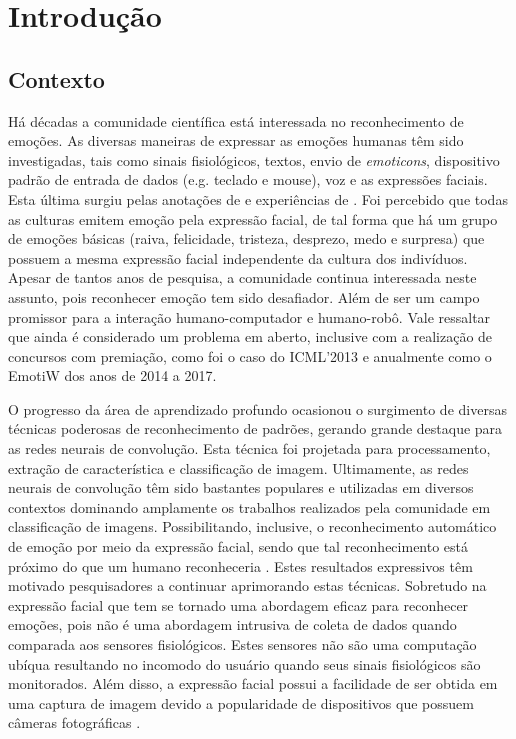 \chapter{Introdução}\label{sec:introducao}

\section{Contexto}
Há décadas a comunidade científica está interessada no reconhecimento de emoções. As diversas maneiras de expressar as emoções humanas têm sido investigadas, tais como sinais fisiológicos, textos, envio de \textit{emoticons}, dispositivo padrão de entrada de dados (e.g. teclado e mouse), voz e as expressões faciais. Esta última surgiu pelas anotações de \cite{darwin1965expression} e experiências de \cite{ekman1994}. Foi percebido que todas as culturas emitem emoção pela expressão facial, de tal forma que há um grupo de emoções básicas (raiva, felicidade, tristeza, desprezo, medo e surpresa) que possuem a mesma expressão facial independente da cultura dos indivíduos. Apesar de tantos anos de pesquisa, a comunidade continua interessada neste assunto, pois reconhecer emoção tem sido desafiador. Além de ser um campo promissor para a interação humano-computador e humano-robô. Vale ressaltar que ainda é considerado um problema em aberto, inclusive com a realização de concursos com premiação, como foi o caso do ICML'2013 e anualmente como o EmotiW dos anos de 2014 a 2017.

O progresso da área de aprendizado profundo ocasionou o surgimento de diversas técnicas poderosas de reconhecimento de padrões, gerando grande destaque para as redes neurais de convolução. Esta técnica foi projetada para processamento, extração de característica e classificação de imagem. Ultimamente, as redes neurais de convolução têm sido bastantes populares e utilizadas em diversos contextos dominando amplamente os trabalhos realizados pela comunidade em classificação de imagens. Possibilitando, inclusive, o reconhecimento automático de emoção por meio da expressão facial, sendo que tal reconhecimento está próximo do que um humano reconheceria \citep{kim2016fusing}. Estes resultados expressivos têm motivado pesquisadores a continuar aprimorando estas técnicas. Sobretudo na expressão facial que tem se tornado uma abordagem eficaz para reconhecer emoções, pois não é uma abordagem intrusiva de coleta de dados quando comparada aos sensores fisiológicos. Estes sensores não são uma computação ubíqua resultando no incomodo do usuário quando seus sinais fisiológicos são monitorados. Além disso, a expressão facial possui a facilidade de ser obtida em uma captura de imagem devido a popularidade de dispositivos que possuem câmeras fotográficas \citep{cruz2017framework}.

